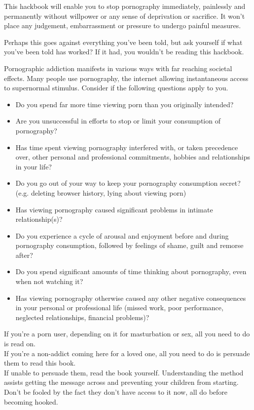 \documentclass[easypeasy.tex]{subfiles}
\begin{document}
This hackbook will enable you to stop pornography immediately, painlessly and permanently without willpower or any sense of deprivation or sacrifice. It won't place any judgement, embarrassment or pressure to undergo painful measures.

Perhaps this goes against everything you've been told, but ask yourself if what you've been told has worked? If it had, you wouldn't be reading this hackbook.

Pornographic addiction manifests in various ways with far reaching societal effects. Many people use pornography, the internet allowing instantaneous access to supernormal stimulus. Consider if the following questions apply to you.

\begin{itemize}
  \item Do you spend far more time viewing porn than you originally intended?
  \item Are you unsuccessful in efforts to stop or limit your consumption of pornography?
  \item Has time spent viewing pornography interfered with, or taken precedence over, other personal and professional commitments, hobbies and relationships in your life?
  \item Do you go out of your way to keep your pornography consumption secret? (e.g. deleting browser history, lying about viewing porn)
  \item Has viewing pornography caused significant problems in intimate relationship(s)?
  \item Do you experience a cycle of arousal and enjoyment before and during pornography consumption, followed by feelings of shame, guilt and remorse after?
  \item Do you spend significant amounts of time thinking about pornography, even when not watching it?
  \item Has viewing pornography otherwise caused any other negative consequences in your personal or professional life (missed work, poor performance, neglected relationships, financial problems)?
\end{itemize}

If you're a porn user, depending on it for masturbation or sex, all you need to do is read on. \\
If you're a non-addict coming here for a loved one, all you need to do is persuade them to read this book. \\
If unable to persuade them, read the book yourself. Understanding the method assists getting the message across and preventing your children from starting. Don't be fooled by the fact they don't have access to it now, all do before becoming hooked.
\end{document}
